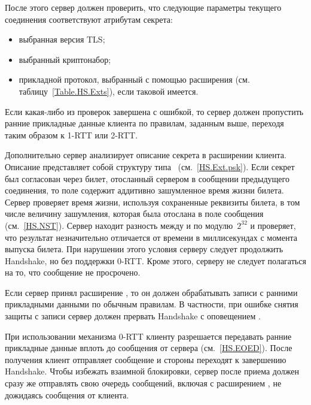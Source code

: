 После этого сервер должен проверить, что следующие параметры текущего соединения 
соответствуют атрибутам секрета:
\begin{itemize} 
\item
выбранная версия TLS;
%
%
\item
выбранный криптонабор;
\item
прикладной протокол, выбранный с помощью расширения 
 (см. 
таблицу~\ref{Table.HS.Exts}), если таковой имеется.
\end{itemize}
%
Если какая-либо из проверок завершена с ошибкой, то сервер должен пропустить ранние 
прикладные данные клиента по правилам, заданным выше, переходя таким образом 
к 1-RTT или 2-RTT.


Дополнительно сервер анализирует описание секрета в расширении
 клиента. Описание представляет собой
структуру типа~ (см.~\ref{HS.Ext.psk}). Если секрет был
согласован через билет, отосланный сервером в сообщении
 предыдущего соединения, то поле
 содержит аддитивно зашумленное время 
жизни билета.
%
Сервер проверяет время жизни, используя сохраненные реквизиты билета,
в том числе величину зашумления, которая была отослана в поле 
 сообщения~ 
(см.~\ref{HS.NST}).
%
Сервер находит разность между  и 
 по модулю~$2^{32}$ и проверяет, что 
результат незначительно отличается от времени в миллисекундах с момента выпуска 
билета. При нарушении этого условия серверу следует продолжить Handshake, но 
без поддержки 0-RTT. Кроме этого, серверу не следует полагаться на то, что 
сообщение  не просрочено.

Если сервер принял расширение , то он должен обрабатывать 
записи с ранними прикладными данными по обычным правилам. В частности, при 
ошибке снятия защиты с записи сервер должен прервать Handshake с оповещением 
.

При использовании механизма 0-RTT клиенту разрешается передавать ранние
прикладные данные вплоть до сообщения  от сервера
(см.~\ref{HS.EOED}). После получения  клиент отправляет
сообщение  и стороны переходят к завершению Handshake.
Чтобы избежать взаимной блокировки, сервер после приема  должен
сразу же отправлять свою очередь сообщений, включая 
с расширением , не дожидаясь сообщения 
 от клиента.

